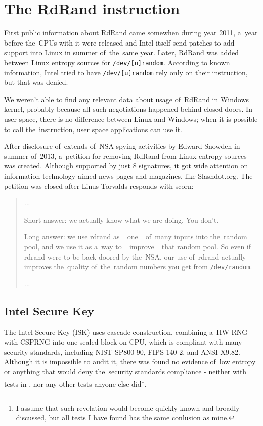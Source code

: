 \chapter{The RdRand instruction}  \label{chap:rdrand-instruction}
First public information about RdRand came somewhen during year 2011\cite{IntelRdRandFindAbout}, a~year before the~CPUs with it were released and Intel itself send patches to add support into Linux in summer of~the~same year\cite{KernelRdRand}. Later, RdRand was added between Linux entropy sources for {\tt /dev/[u]random}.%
According to known information\cite{TheodoreTsoNSA}, Intel tried to have {\tt /dev/[u]random} rely only on their instruction, but that was denied. 

We weren't able to find any relevant data about usage of~RdRand in Windows kernel, probably because all such negotiations happened behind closed doors. In user space, there is no difference between Linux and Windows; when it is possible to call the~instruction, user space applications can use it. 

After disclosure of~extends of~NSA spying activities by Edward Snowden in summer of~2013\cite{GuardianNSA,DailymailNSA}, a~petition for removing RdRand from Linux entropy sources was created\cite{PetitionRdRand}. Although supported by just 8 signatures, it got wide attention on information-technology aimed news pages and magazines, like Slashdot.org\cite{PetitionRdRandSlashdot}. The petition was closed after Linus Torvalds responds with scorn:

\begin{quote} ...

Short answer: we actually know what we are doing. You don't.

Long answer: we use rdrand as \_one\_ of~many inputs into the~random pool, and we use it as a~way to \_improve\_ that random pool. So even if rdrand were to be back-doored by the~NSA, our use of~rdrand actually improves the~quality of~the~random numbers you get from {\tt /dev/random}.

...
\end{quote}


\section{Intel Secure Key}\label{sec:intel-secure-key}
The Intel Secure Key (ISK) uses cascade construction, combining a~HW RNG with CSPRNG into one sealed block on CPU, which is compliant with many security standards, including NIST SP800-90, FIPS-140-2, and ANSI X9.82\cite{IntelDRNGGuide}. Although it is impossible to audit it, there was found no evidence of~low entropy or anything that would deny the~security standards compliance - neither with tests in , nor any other tests anyone else did\footnote{I assume that such revelation would become quickly known and broadly discussed, but all tests I have found has the same conlusion as mine.}.

